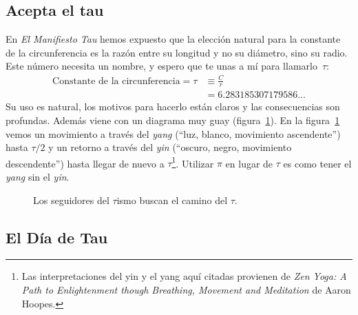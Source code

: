 
  \subsection{Acepta el tau} %
  \label{sec:embrace_the_tau}

En \emph{El Manifiesto Tau} hemos expuesto que la elección natural para la constante de la circunferencia es la razón entre su longitud y no su diámetro, sino su radio. Este número necesita un nombre, y espero que te unas a mí para llamarlo~$\tau$:
\[
\begin{split}
\mbox{Constante de la circunferencia} = \tau & \equiv \frac{C}{r} \\
                                             & = 6.283185307179586\ldots
\end{split}
\]
Su uso es natural, los motivos para hacerlo están claros y las consecuencias son profundas. Además viene con un diagrama muy guay (figura~\ref{fig:tauism}). En la figura~\ref{fig:tauism} vemos un movimiento a través del \emph{yang} (``luz, blanco, movimiento ascendente'') hasta $\tau/2$ y un retorno a través del \emph{yin} (``oscuro, negro, movimiento descendente'') hasta llegar de nuevo a $\tau$\footnote{Las interpretaciones del yin y el yang aquí citadas provienen de \emph{Zen Yoga: A Path to Enlightenment though Breathing, Movement and Meditation} de Aaron Hoopes.}. Utilizar $\pi$ en lugar de $\tau$ es como tener el \emph{yang} sin el \emph{yin}.

\begin{figure}
\begin{center}
\end{center}
\caption{Los seguidores del $\tau$ismo buscan el camino del $\tau$.\label{fig:tauism}}
\end{figure}



\renewcommand{\thesubsection}{6.28}

  \subsection{El Día de Tau} %
  \label{sec:tau_day}

